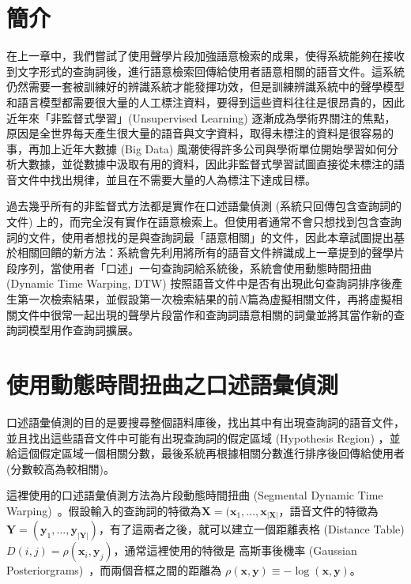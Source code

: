 \section{簡介}
在上一章中，我們嘗試了使用聲學片段加強語意檢索的成果，使得系統能夠在接收到文字形式的查詢詞後，進行語意檢索回傳給使用者語意相關的語音文件。這系統仍然需要一套被訓練好的辨識系統才能發揮功效，但是訓練辨識系統中的聲學模型和語言模型都需要很大量的人工標注資料，要得到這些資料往往是很昂貴的，因此近年來「非監督式學習」(Unsupervised Learning) 逐漸成為學術界關注的焦點，原因是全世界每天產生很大量的語音與文字資料，取得未標注的資料是很容易的事，再加上近年大數據 (Big Data)
風潮使得許多公司與學術單位開始學習如何分析大數據，並從數據中汲取有用的資料，因此非監督式學習試圖直接從未標注的語音文件中找出規律，並且在不需要大量的人為標注下達成目標。

過去幾乎所有的非監督式方法都是實作在口述語彙偵測 (系統只回傳包含查詢詞的文件) 上的，而完全沒有實作在語意檢索上。但使用者通常不會只想找到包含查詢詞的文件，使用者想找的是與查詢詞最「語意相關」的文件，因此本章試圖提出基於相關回饋的新方法：系統會先利用將所有的語音文件辨識成上一章提到的聲學片段序列，當使用者「口述」一句查詢詞給系統後，系統會使用動態時間扭曲 (Dynamic Time Warping, DTW) 按照語音文件中是否有出現此句查詢詞排序後產生第一次檢索結果，並假設第一次檢索結果的前$N$篇為虛擬相關文件，再將虛擬相關文件中很常一起出現的聲學片段當作和查詢詞語意相關的詞彙並將其當作新的查詢詞模型用作查詢詞擴展。
  
\section{使用動態時間扭曲之口述語彙偵測}
\label{sec:chap4_sdtw}
口述語彙偵測的目的是要搜尋整個語料庫後，找出其中有出現查詢詞的語音文件，並且找出這些語音文件中可能有出現查詢詞的假定區域 (Hypothesis Region) ，並給這個假定區域一個相關分數，最後系統再根據相關分數進行排序後回傳給使用者 (分數較高為較相關)。

這裡使用的口述語彙偵測方法為片段動態時間扭曲 (Segmental Dynamic Time Warping)~\cite{chan2010unsupervised, hazen2009query}。假設輸入的查詢詞的特徵為$\mathbf{X} = (\mathbf{x}_1, ..., \mathbf{x}_{|\mathbf{X}|}$，語音文件的特徵為$\mathbf{Y} = (\mathbf{y}_1, ..., \mathbf{y}_{|\mathbf{Y}|})$，有了這兩者之後，就可以建立一個距離表格 (Distance Table) $D(i, j) = \rho(\mathbf{x}_i, \mathbf{y}_j)$，通常這裡使用的特徵是
高斯事後機率 (Gaussian Posteriorgrams)~\cite{zhang2009unsupervised}，而兩個音框之間的距離為 $\rho(\mathbf{x}, \mathbf{y}) \equiv -\log (\mathbf{x}, \mathbf{y})$。


